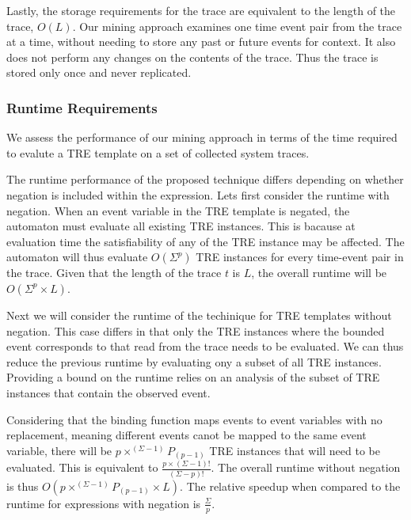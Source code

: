 \documentclass[]{sigplanconf}
\begin{document}
Lastly, the storage requirements for the trace are equivalent to the length of the trace, $O(L)$.
Our mining approach examines one time event pair from the trace at a time, without needing to
store any past or future events for context. It also does not perform any changes on the
contents of the trace. Thus the trace is stored only once and never replicated.



\subsubsection{Runtime Requirements}

We assess the performance of our mining approach in terms of the time required to evalute a TRE template on a set of collected system traces.

The runtime performance of the proposed technique differs depending on whether negation is included within the expression.
Lets first consider the runtime with negation. When an event variable in the TRE template is negated, the automaton must evaluate all existing TRE instances. This is bacause at evaluation time the satisfiability of any of the TRE instance may be affected. The automaton will thus evaluate $O(\Sigma^p)$ TRE instances for every time-event pair in the trace. Given that the length of the trace $t$ is $L$, the overall runtime will be $O(\Sigma^p \times L)$.

Next we will consider the runtime of the techinique for TRE templates without negation. This case differs in that only the TRE instances where the bounded event corresponds to that read from the trace needs to be evaluated. We can thus reduce the previous runtime by evaluating ony a subset of all TRE instances. Providing a bound on the runtime relies on an analysis of the subset of TRE instances that contain the observed event.

Considering that the binding function maps events to event variables with no replacement, meaning different events canot be mapped to the same event variable, there will be $p \times ^{(\Sigma - 1)}P_{(p - 1)}$ TRE instances that will need to be evaluated. This is equivalent to $\frac{p \times (\Sigma - 1)!}{(\Sigma - p)!}$. The overall runtime without negation is thus
$O(p \times ^{(\Sigma - 1)}P_{(p - 1)} \times L)$. The relative speedup when compared to the runtime for expressions with negation is $\frac{\Sigma}{p}$.

\end{document}
